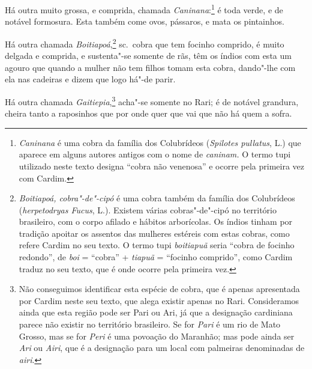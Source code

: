  Há outra muito grossa, e comprida, chamada \textit{Caninana}:\footnote{ \textit{Caninana} 
é uma cobra da família dos Colubrídeos (\textit{Spilotes pullatus}, L.) 
que aparece em alguns autores antigos com o nome de \textit{caninam.} O termo tupi utilizado neste texto
designa ``cobra não venenosa'' e ocorre pela primeira vez com Cardim.} é
toda verde, e de notável formosura. Esta também come ovos, pássaros, e mata os pintainhos.

 Há outra chamada \textit{Boitiapoá},\footnote{ \textit{Boitiapoá,
cobra"-de"-cipó} é uma cobra também da família dos Colubrídeos 
(\textit{herpetodryas Fucus}, L.). Existem várias cobras"-de"-cipó no
território brasileiro, com o corpo afilado e hábitos arborícolas. Os
índios tinham por tradição apoitar os assentos das mulheres estéreis
com estas cobras, como refere Cardim no seu texto. O termo tupi
\textit{boitiapuã} seria ``cobra de focinho redondo'', de \textit{boi} 
= ``cobra'' + \textit{tiapuã} = ``focinho comprido'', como Cardim traduz no
seu texto, que é onde ocorre pela primeira vez.} sc.~cobra que tem
focinho comprido, é muito delgada e comprida, e sustenta"-se somente de
rãs, têm os índios com esta um agouro que quando a mulher não tem
filhos tomam esta cobra, dando"-lhe com ela nas cadeiras e dizem que logo há"-de parir.

 Há outra chamada \textit{Gaitiepia},\footnote{ Não conseguimos
identificar esta espécie de cobra, que é apenas apresentada por Cardim
neste seu texto, que alega existir apenas no Rari. Consideramos ainda
que esta região pode ser Pari ou Ari, já que a designação cardiniana
parece não existir no território brasileiro. Se for \textit{Pari} é um
rio de Mato Grosso, mas se for \textit{Peri} é uma povoação do
Maranhão; mas pode ainda ser \textit{Ari} ou \textit{Airi}, 
que é a designação para um local com palmeiras denominadas de
\textit{airi}.} acha"-se somente no Rari; é de notável grandura,
cheira tanto a raposinhos que por onde quer que vai que não há quem a sofra.

